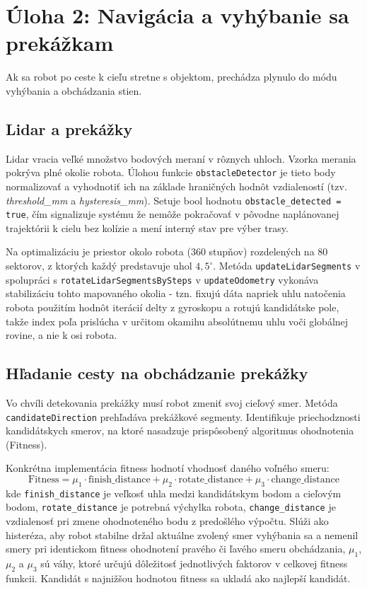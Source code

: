 \newpage
\section{Úloha 2: Navigácia a vyhýbanie sa prekážkam}
Ak sa robot po ceste k cieľu stretne s objektom, prechádza plynulo do módu vyhýbania a obchádzania stien. 

\subsection{Lidar a prekážky}
Lidar vracia veľké množstvo bodových meraní v rôznych uhloch. Vzorka merania pokrýva plné okolie robota. Úlohou funkcie \texttt{obstacleDetector} je tieto body normalizovať a vyhodnotiť ich na základe hraničných hodnôt vzdialeností (tzv. \textit{threshold\_mm} a \textit{hysteresis\_mm}). Setuje bool hodnotu \texttt{obstacle\_detected = true}, čím signalizuje systému že nemôže pokračovať v pôvodne naplánovanej trajektórii k cielu bez kolízie a mení interný stav pre výber trasy.

Na optimalizáciu je priestor okolo robota (360 stupňov) rozdelených na 80 sektorov, z ktorých každý predstavuje uhol $4,5^\circ$. Metóda \texttt{updateLidarSegments} v spolupráci s \texttt{rotateLidarSegmentsBySteps} v \texttt{updateOdometry} vykonáva stabilizáciu tohto mapovaného okolia - tzn. fixujú dáta napriek uhlu natočenia robota použitím hodnôt iterácií delty z gyroskopu a rotujú kandidátske pole, takže index poľa prislúcha v určitom okamihu absolútnemu uhlu voči globálnej rovine, a nie k osi robota.

\subsection{Hľadanie cesty na obchádzanie prekážky}
Vo chvíli detekovania prekážky musí robot zmeniť svoj cieľový smer. Metóda \texttt{candidateDirection} prehľadáva prekážkové segmenty. Identifikuje priechodznosti kandidátskych smerov, na ktoré nasadzuje prispôsobený algoritmus ohodnotenia (Fitness).

Konkrétna implementácia fitness hodnotí vhodnosť daného voľného smeru:
\begin{equation}
    \text{Fitness} = \mu_1 \cdot \text{finish\_distance} + \mu_2 \cdot \text{rotate\_distance} + \mu_3 \cdot \text{change\_distance}
\end{equation}
kde \texttt{finish\_distance} je veľkosť uhla medzi kandidátskym bodom a cieľovým bodom, \texttt{rotate\_distance} je potrebná výchylka robota, \texttt{change\_distance} je vzdialenosť pri zmene ohodnoteného bodu z predošlého výpočtu. Slúži ako histeréza, aby robot stabilne držal aktuálne zvolený smer vyhýbania sa a nemenil smery pri identickom fitness ohodnotení pravého či ľavého smeru obchádzania, $\mu_1$, $\mu_2$ a $\mu_3$ sú váhy, ktoré určujú dôležitosť jednotlivých faktorov v celkovej fitness funkcii. Kandidát s najnižšou hodnotou fitness sa ukladá ako najlepší kandidát. 


